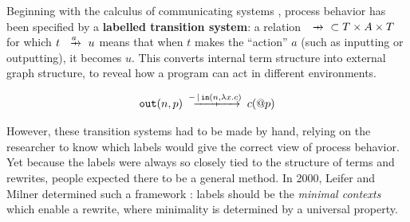 \documentclass{article}
\begin{document}
Beginning with the calculus of communicating systems \cite{ccs}, process behavior has been specified by a \textbf{labelled transition system}: a relation $\xr\;\; \subset T\times A\times T$ for which $t\xr{a} u$ means that when $t$ makes the ``action'' $a$ (such as inputting or outputting), it becomes $u$. This converts internal term structure into external graph structure, to reveal how a program can act in different environments.

\[\mtt{out}(n,p) \xr{-\pr \mtt{in}(n,\lambda x.c)} c(@p)\]

However, these transition systems had to be made by hand, relying on the researcher to know which labels would give the correct view of process behavior. Yet because the labels were always so closely tied to the structure of terms and rewrites, people expected there to be a general method. In 2000, Leifer and Milner determined such a framework \cite{lm}: labels should be the \textit{minimal contexts} which enable a rewrite, where minimality is determined by a universal property.

\end{document}
